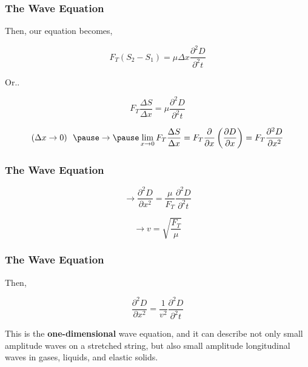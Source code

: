 \documentclass[]{beamer}
\begin{document}
\begin{frame}
\frametitle{The Wave Equation}


Then, our equation becomes,

\pause

\begin{equation*}
F_T(S_2-S_1)=\mu \Delta x\frac{\partial^2D}{\partial^2 t}
\end{equation*}

Or..

\pause

\begin{equation*}
F_T\frac{\Delta S}{\Delta x}=\mu \frac{\partial^2D}{\partial^2 t}
\end{equation*}

\pause



\begin{equation*}
  (\Delta x \rightarrow 0) ~~\pause \rightarrow \pause \lim_{x\to 0} F_T\frac{\Delta S}{\Delta x}=F_T\frac{\partial}{\partial x}\left(\frac{\partial D}{\partial x}\right)=F_T\frac{\partial^2D}{\partial x^2}
\end{equation*}
\pause




  \end{frame}








\begin{frame}
\frametitle{The Wave Equation}




\begin{equation}
\rightarrow \frac{\partial^2D}{\partial x^2}=\frac{\mu}{F_T} \frac{\partial^2D}{\partial^2 t}
\end{equation}


\pause

\begin{equation*}
\rightarrow v=\sqrt{\frac{F_T}{\mu}}
\end{equation*}


  \end{frame}




\begin{frame}
\frametitle{The Wave Equation}



Then,


\begin{equation}
\boxed{\frac{\partial^2D}{\partial x^2}=\frac{1}{v^2} \frac{\partial^2D}{\partial^2 t}}
\end{equation}

\pause

\vspace{3mm}

\textcolor{mypink1}{This is the \textbf{one-dimensional} wave equation, and it can describe not only small
amplitude waves on a stretched string, but also small amplitude longitudinal waves
in gases, liquids, and elastic solids.}

  \end{frame}
\end{document}
